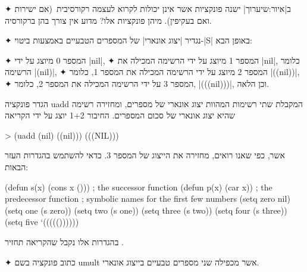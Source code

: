 \begin{enumerate}
  ✦ ב|איור:שיערוך| ישנה פונקציות אשר אינן יכולות לקרוא לעצמה רקורסיבית~(אם
  ישירות ואם בעקיפין). מיהן פונקציות אלו? מדוע אין צורך בהן ברקורסיה.

  ✦ נגדיר \ע|יצוג אונארי| של המספרים הטבעיים באמצעות ביטוי-\E|S| באופן הבא:
  \begin{itemize}
    ✦ המספר 0 מיוצג על ידי \E|nil|,
    ✦ המספר 1 מיוצג על ידי הרשימה המכילה את \E|nil|, כלומר הרשימה \E|(nil)|,
    ✦ המספר 2 מיוצג על ידי הרשימה המכילה את המספר 1, כלומר \E|((nil))|,
    ✦ המספר 3 על ידי הרשימה המכילה את המספר 2, כלומר, \E|(((nil)))|,
    וכן הלאה.
  \end{itemize}
  הגדר פונקציה uadd המקבלת שתי רשימות המהוות יצוג אונארי של מספרים,
  ומחזירה רשימה שהיא יצוג אונארי של סכום המספרים. החיבור 1+2 יוצג על ידי
  הקריאה
  \begin{LISP}
> (uadd (nil) ((nil)))
(((NIL)))
\end{LISP}
  אשר, כפי שאנו רואים, מחזירה את הייצוג של המספר 3.
  כדאי להשתמש בהגדרות העזר הבאות:
  \begin{LISP}
(defun s(x) (cons x ())) ; the successor function
(defun p(x) (car x)) ; the predecessor function
; symbolic names for the first few numbers
(setq zero nil)
(setq one (s zero))
(setq two (s one))
(setq three (s two))
(setq four (s three))
(setq five ‘((((())))))
\end{LISP}
  בהגדרות אלו נקבל שהקריאה
  תחזיר \lisp{((((()))))}.

  ✦ כתוב פונקציה בשם umult אשר מכפילה שני מספרים טבעיים בייצוג אונארי.


\end{enumerate}
